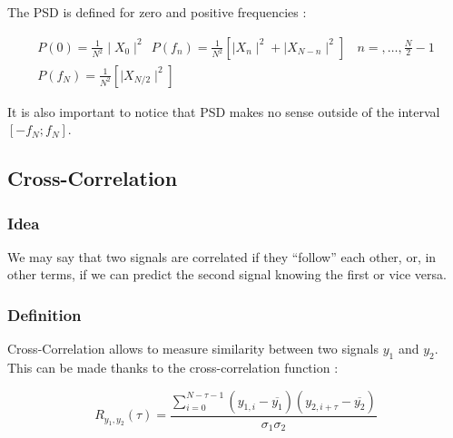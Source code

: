 The PSD is defined  for zero and positive frequencies : 

\begin{gather*}
    P(0) = \frac{1}{N^2}\mid X_0 \mid ^2 ~~ P(f_n) = \frac{1}{N^2}\left[\mid X_n\mid ^2 + \mid X_{N-n}\mid ^2 \right] ~~~~n= ,\dots, \frac{N}{2}-1 \\
    P(f_N) = \frac{1}{N^2} \left[\mid X_{N/2} \mid ^2 \right]
\end{gather*} 

It is also important to notice that PSD makes no sense outside of the interval \([-f_N ; f_N]\). 

\subsection{Cross-Correlation}

\subsubsection{Idea}

We may say that two signals are correlated if they “follow” each other, or, in
other terms, if we can predict the second signal knowing the first or vice versa. 

\subsubsection{Definition}

Cross-Correlation allows to measure similarity between two signals \(y_1\) and \(y_2\). This can be made thanks to the cross-correlation function : 

\begin{equation}\label{correlation function}
    R_{y_1, y_2} (\tau) = \frac{\sum_{i=0}^{N-\tau - 1} (y_{1,i}- \overline{y_1})(y_{2,i+\tau}-\overline{y_2})}{\sigma_1 \sigma_2}
\end{equation}


